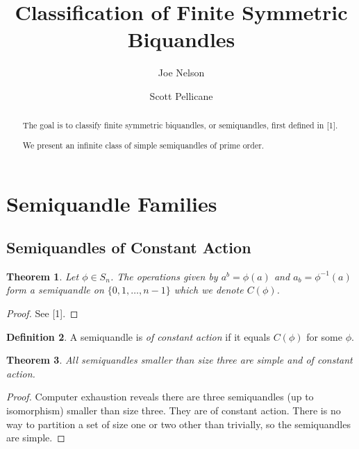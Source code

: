 \documentclass{amsart}
\newtheorem{thm}{Theorem}[section]
\theoremstyle{definition}
\newtheorem{definition}[thm]{Definition}
\numberwithin{equation}{section}
\begin{document}
\title{Classification of Finite Symmetric Biquandles}

\author{Joe Nelson}
\author{Scott Pellicane}


\begin{abstract}
The goal is to classify finite symmetric biquandles, or semiquandles, first defined in [1].

We present an infinite class of simple semiquandles of prime order.
\end{abstract}

\maketitle



\section{Semiquandle Families}

\subsection{Semiquandles of Constant Action}

\begin{thm}
Let $\phi \in S_n$. The operations given by $a^{b} = \phi(a)$ and $a_b = \phi^{-1}(a)$ form
a semiquandle on $\{0, 1, \ldots, n-1\}$ which we denote $C(\phi)$.
\end{thm}
\begin{proof}
See [1].
\end{proof}

\begin{definition}
A semiquandle is \emph{of constant action} if it equals $C(\phi)$ for some $\phi$.
\end{definition}

\begin{thm}
All semiquandles smaller than size three are simple and of constant action.
\end{thm}
\begin{proof}
Computer exhaustion reveals there are three semiquandles (up to isomorphism) smaller than
size three. They are of constant action. There is no way to partition a set of size one or two
other than trivially, so the semiquandles are simple.
\end{proof}
\end{document}
